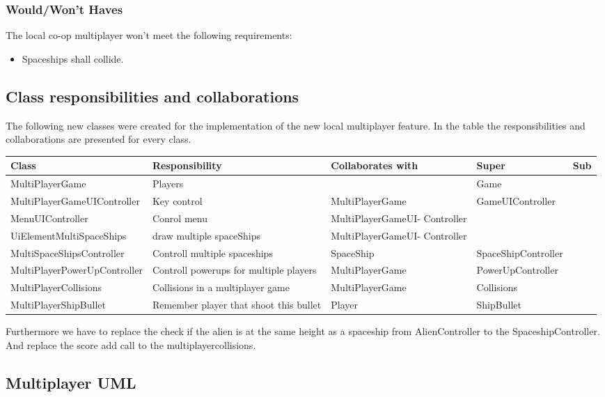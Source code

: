 \documentclass[10pt]{article}
\begin{document}
\subsubsection{Would/Won't Haves}
The local co-op multiplayer won't meet the following requirements:
\begin{itemize}
	\item Spaceships shall collide.
\end{itemize}
\newpage

\subsection{Class responsibilities and collaborations}


The following new classes were created for the implementation of the new local multiplayer feature.
In the table the responsibilities and collaborations are presented for every class.
\begin{center}
    \begin{tabular}{ | p{4.5cm} | p{3cm} | p{3cm} | p{3cm} | p{1cm} |}
  \hline
    Class & Responsibility & Collaborates with & Super & Sub \\ \hline
   MultiPlayerGame & Players  & & Game & \\ \hline
   MultiPlayerGameUIController & Key control & MultiPlayerGame  & GameUIController  & \\ \hline
   MenuUIController& Conrol menu & MultiPlayerGameUI- Controller  &   &  \\ \hline
   UiElementMultiSpaceShips& draw multiple spaceShips & MultiPlayerGameUI- Controller  &  &  \\ \hline
 MultiSpaceShipsController& Controll multiple spaceships & SpaceShip  & SpaceShipController &  \\ \hline
 MultiPlayerPowerUpController& Controll powerups for multiple players & MultiPlayerGame   & PowerUpController &  \\ \hline
 MultiPlayerCollisions & Collisions in a multiplayer game & MultiPlayerGame   & Collisions&  \\ \hline
 MultiPlayerShipBullet & Remember player that shoot this bullet & Player  & ShipBullet &  \\ \hline

    \end{tabular}
\end{center}

Furthermore we have to replace the check if the alien is at the same height as a spaceship from AlienController to the SpaceshipController. \newline
And replace the score add call to the multiplayercollisions.


\subsection{Multiplayer UML}
\end{document}
